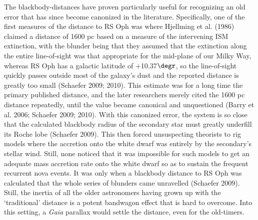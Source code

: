 \documentclass[a4paper,fleqn,usenatbib]{mnras}
\begin{document}
The blackbody-distances have proven particularly useful for recognizing an old error that has since become canonized in the literature.  Specifically, one of the first measures of the distance to RS Oph was where Hjellming et al. (1986) claimed a distance of 1600 pc based on a measure of the intervening ISM extinction, with the blunder being that they assumed that the extinction along the entire line-of-sight was that appropriate for the mid-plane of our Milky Way, whereas RS Oph has a galactic latitude of +10.37$\degr$, so the line-of-sight quickly passes outside most of the galaxy's dust and the reported distance is greatly too small (Schaefer 2009; 2010).  This estimate was for a long time the primary published distance, and the later researchers merely cited the 1600 pc distance repeatedly, until the value became canonical and unquestioned (Barry et al. 2006; Schaefer 2009; 2010).  With this canonized error, the system is so close that the calculated blackbody radius of the  secondary star must greatly underfill its Roche lobe (Schaefer 2009).  This then forced unsuspecting theorists to rig models where the accretion onto the white dwarf was entirely by the secondary's stellar wind.  Still, none noticed that it was impossible for such models to get an adequate mass accretion rate onto the white dwarf so as to sustain the frequent recurrent nova events.  It was only when a blackbody distance to RS Oph was calculated that the whole series of blunders came unravelled (Schaefer 2009).  Still, the inertia of all the older astronomers having grown up with the `traditional' distance is a potent bandwagon effect that is hard to overcome.  Into this setting, a {\it Gaia} parallax would settle the distance, even for the old-timers.
\end{document}
